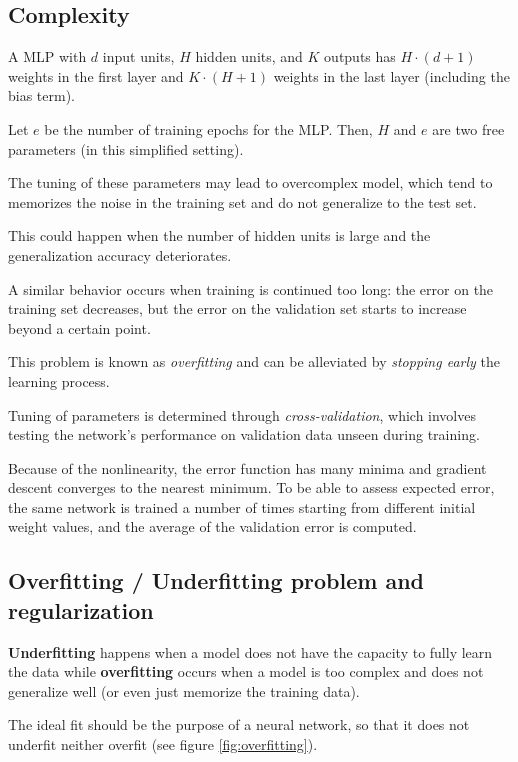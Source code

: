 \subsection{Complexity}

A MLP with $d$ input units, $H$ hidden units, and $K$ outputs has $H \cdot (d+1)$ weights in the first layer and $K \cdot (H+1)$ weights in the last layer (including the bias term).

Let $e$ be the number of training epochs for the MLP. Then, $H$ and $e$ are two free parameters (in this simplified setting).

The tuning of these parameters may lead to overcomplex model, which tend to memorizes the noise in the training set and do not generalize to the test set.

This could happen when the number of hidden units is large and the generalization accuracy deteriorates.

A similar behavior occurs when training is continued  too long: the error on the training set decreases, but the  error on  the  validation set  starts to  increase beyond  a  certain point.

This problem is known as \textit{overfitting} and can be alleviated by \textit{stopping early} the learning process.

Tuning of parameters is determined through \textit{cross-validation}, which involves testing the network’s performance on validation data unseen during training.

Because of the nonlinearity, the error function has many minima and gradient descent converges to the nearest minimum. To be able to assess expected  error,  the  same  network  is  trained  a  number  of  times  starting from different initial weight values, and the average of the validation error is computed.

\subsection{Overfitting / Underfitting problem and regularization}

\textbf{Underfitting} happens when a model does not have the capacity to fully learn the data while \textbf{overfitting} occurs when a model is too complex and does not generalize well (or even just memorize the training data).

The ideal fit should be the purpose of a neural network, so that it does not underfit neither overfit (see figure \ref{fig:overfitting}).

